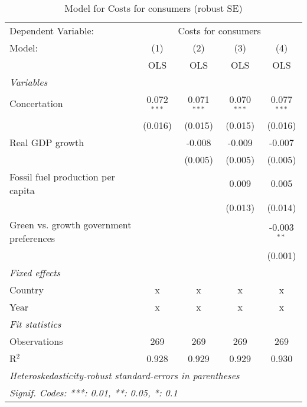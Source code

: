 
\begin{table}[htbp]
   \caption{Model for Costs for consumers (robust SE)}
   \centering
   \begin{tabular}{lcccc}
      \toprule
      Dependent Variable: & \multicolumn{4}{c}{Costs for consumers}\\
      Model:                                  & (1)           & (2)           & (3)           & (4)\\  
                                              &  OLS          & OLS           & OLS           & OLS\\  
      \midrule
      \emph{Variables}\\
      Concertation                            & 0.072$^{***}$ & 0.071$^{***}$ & 0.070$^{***}$ & 0.077$^{***}$\\   
                                              & (0.016)       & (0.015)       & (0.015)       & (0.016)\\   
      Real GDP growth                         &               & -0.008        & -0.009        & -0.007\\   
                                              &               & (0.005)       & (0.005)       & (0.005)\\   
      Fossil fuel production per capita       &               &               & 0.009         & 0.005\\   
                                              &               &               & (0.013)       & (0.014)\\   
      Green vs. growth government preferences &               &               &               & -0.003$^{**}$\\   
                                              &               &               &               & (0.001)\\   
      \emph{Fixed effects}\\
      Country                                 & x             & x             & x             & x\\  
      Year                                    & x             & x             & x             & x\\  
      \midrule \emph{Fit statistics}\\
      Observations                            & 269           & 269           & 269           & 269\\  
      R$^2$                                   & 0.928         & 0.929         & 0.929         & 0.930\\  
      \midrule
      \multicolumn{5}{l}{\emph{Heteroskedasticity-robust standard-errors in parentheses}}\\
      \multicolumn{5}{l}{\emph{Signif. Codes: ***: 0.01, **: 0.05, *: 0.1}}\\
   \end{tabular}
\end{table}


